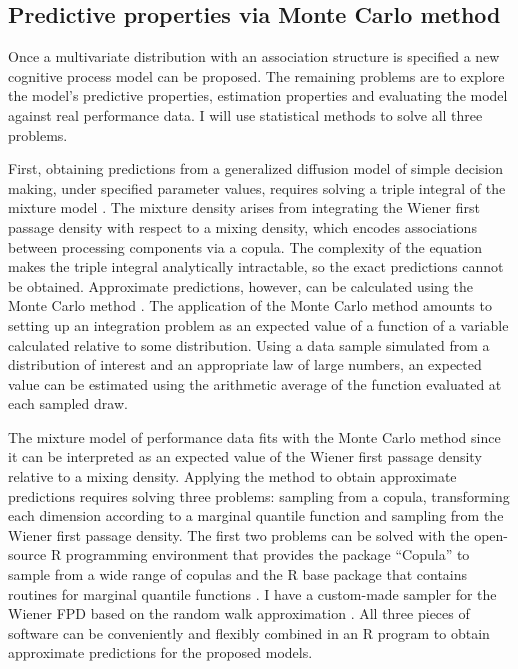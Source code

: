 \documentclass[12pt]{article}
\begin{document}
\subsection{Predictive properties via Monte Carlo method}
	Once a multivariate distribution with an association structure is specified a new cognitive process model can be proposed. The remaining problems are to explore the model’s predictive properties, estimation properties and evaluating the model against real performance data. I will use statistical methods to solve all three problems. 
	
    First, obtaining predictions from a generalized diffusion model of simple decision making, under specified parameter values, requires solving a triple integral of the mixture model \citep{Tue2004}. The mixture density arises from integrating the Wiener first passage density with respect to a mixing density, which encodes associations between processing components via a copula. The complexity of the equation makes the triple integral analytically intractable, so the exact predictions cannot be obtained. Approximate predictions, however, can be calculated using the Monte Carlo method \citep{RobCas2004,GamLop2006}. The application of the Monte Carlo method amounts to setting up an integration problem as an expected value of a function of a variable calculated relative to some distribution. Using a data sample simulated from a distribution of interest and an appropriate law of large numbers, an expected value can be estimated using the arithmetic average of the function evaluated at each sampled draw.
	
    The mixture model of performance data fits with the Monte Carlo method since it can be interpreted as an expected value of the Wiener first passage density relative to a mixing density. Applying the method to obtain approximate predictions requires solving three problems: sampling from a copula, transforming each dimension according to a marginal quantile function and sampling from the Wiener first passage density. The first two problems can be solved with the open-source R programming environment that provides the package “Copula” to sample from a wide range of copulas and the R base package that contains routines for marginal quantile functions \citep{Rte2012,HofKoj2013}. I have a custom-made sampler for the Wiener FPD based on the random walk approximation \citep{TueMar2001}. All three pieces of software can be conveniently and flexibly combined in an R program to obtain approximate predictions for the proposed models.
\end{document}
